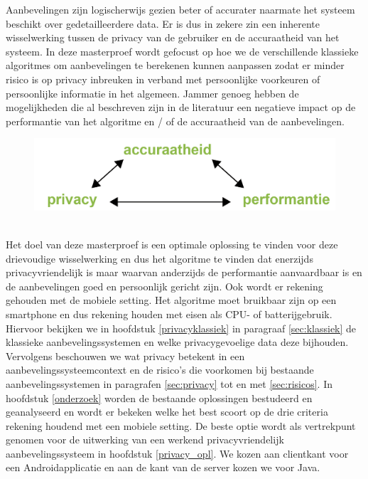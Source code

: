 Aanbevelingen zijn logischerwijs gezien beter of accurater naarmate het systeem beschikt over gedetailleerdere data. Er is dus in zekere zin een inherente wisselwerking tussen de privacy van de gebruiker en de accuraatheid van het systeem. In deze masterproef wordt gefocust op hoe we de verschillende klassieke algoritmes om aanbevelingen te berekenen kunnen aanpassen zodat er minder risico is op privacy inbreuken in verband met persoonlijke voorkeuren of persoonlijke informatie in het algemeen. Jammer genoeg hebben de mogelijkheden die al beschreven zijn in de literatuur een negatieve impact op de performantie van het algoritme en / of de accuraatheid van de aanbevelingen. 
\begin{figure}[htpb]   
    \label{Figuur::wisselwerking}      
  \begin{center}    
 \includegraphics[width=\textwidth,height=\textheight,keepaspectratio]{fig/wisselwerking}    
  \end{center}     
   \end{figure}\\
Het doel van deze masterproef is een optimale oplossing te vinden voor deze drievoudige wisselwerking en dus het algoritme te vinden dat enerzijds privacyvriendelijk is maar waarvan anderzijds de performantie aanvaardbaar is en de aanbevelingen goed en persoonlijk gericht zijn. Ook wordt er rekening gehouden met de mobiele setting. Het algoritme moet bruikbaar zijn op een smartphone en dus rekening houden met eisen als CPU- of batterijgebruik.\\

Hiervoor bekijken we in hoofdstuk \ref{privacyklassiek} in paragraaf \ref{sec:klassiek} de klassieke aanbevelingssystemen en welke privacygevoelige data deze bijhouden. Vervolgens beschouwen we wat privacy betekent in een aanbevelingssysteemcontext en de risico's die voorkomen bij bestaande aanbevelingssystemen in paragrafen \ref{sec:privacy} tot en met \ref{sec:risicos}. In hoofdstuk \ref{onderzoek} worden de bestaande oplossingen bestudeerd en geanalyseerd en wordt er bekeken welke het best scoort op de drie criteria rekening houdend met een mobiele setting. De beste optie wordt als vertrekpunt genomen voor de uitwerking van een werkend privacyvriendelijk aanbevelingssysteem in hoofdstuk \ref{privacy_opl}. We kozen aan clientkant voor een Androidapplicatie en aan de kant van de server kozen we voor Java.
 
